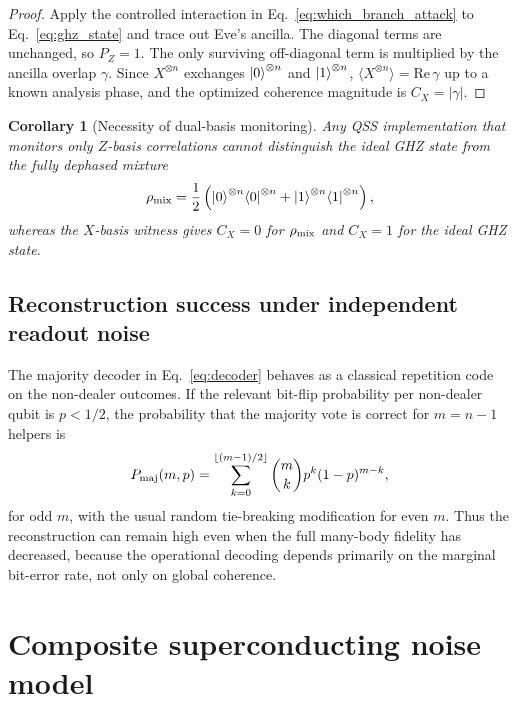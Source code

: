 \documentclass[aip,amsmath,amssymb,reprint,longbibliography]{revtex4-2}
\newtheorem{corollary}{Corollary}
\newcommand{\ketzero}{\ket{0}^{\otimes n}}
\newcommand{\ketone}{\ket{1}^{\otimes n}}
\newcommand{\brazero}{\bra{0}^{\otimes n}}
\newcommand{\braone}{\bra{1}^{\otimes n}}
\begin{document}
\begin{proof}
Apply the controlled interaction in Eq.~\eqref{eq:which_branch_attack} to Eq.~\eqref{eq:ghz_state} and trace out Eve's ancilla.  The diagonal terms are unchanged, so $P_Z=1$.  The only surviving off-diagonal term is multiplied by the ancilla overlap $\gamma$.  Since $X^{\otimes n}$ exchanges $\ketzero$ and $\ketone$, $\langle X^{\otimes n}\rangle=\mathrm{Re}\,\gamma$ up to a known analysis phase, and the optimized coherence magnitude is $C_X=|\gamma|$.
\end{proof}

\begin{corollary}[Necessity of dual-basis monitoring]
\label{cor:dual_basis}
Any QSS implementation that monitors only $Z$-basis correlations cannot distinguish the ideal GHZ state from the fully dephased mixture
\begin{equation}
\rho_{\rm mix}=\frac{1}{2}\left(\ketzero\!\brazero+\ketone\!\braone\right),
\label{eq:ghz_mixture}
\end{equation}
whereas the $X$-basis witness gives $C_X=0$ for $\rho_{\rm mix}$ and $C_X=1$ for the ideal GHZ state.
\end{corollary}

\subsection{Reconstruction success under independent readout noise}
\label{subsec:majority_theory}

The majority decoder in Eq.~\eqref{eq:decoder} behaves as a classical repetition code on the non-dealer outcomes.  If the relevant bit-flip probability per non-dealer qubit is $p<1/2$, the probability that the majority vote is correct for $m=n-1$ helpers is
\begin{equation}
P_{\rm maj}(m,p)=\sum_{k=0}^{\lfloor (m-1)/2\rfloor}\binom{m}{k}p^k(1-p)^{m-k},
\label{eq:maj_success}
\end{equation}
for odd $m$, with the usual random tie-breaking modification for even $m$.  Thus the reconstruction can remain high even when the full many-body fidelity has decreased, because the operational decoding depends primarily on the marginal bit-error rate, not only on global coherence.

\section{Composite superconducting noise model}
\label{sec:noise_model}
\end{document}
